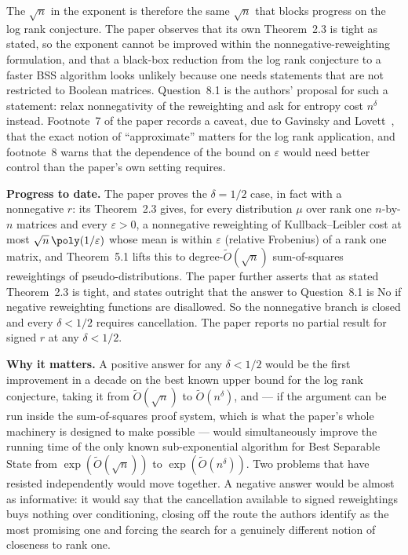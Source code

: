 \documentclass{conjura-conjecture}
\newcommand{\Ot}{\tilde{O}}
\begin{document}
The $\sqrt{n}$ in the exponent is therefore the same $\sqrt{n}$ that
blocks progress on the log rank conjecture. The paper observes that
its own Theorem~2.3 is tight as stated, so the exponent cannot be
improved within the nonnegative-reweighting formulation, and that a
black-box reduction from the log rank conjecture to a faster BSS
algorithm looks unlikely because one needs statements that are not
restricted to Boolean matrices. Question~8.1 is the authors' proposal
for such a statement: relax nonnegativity of the reweighting and ask
for entropy cost $n^{\delta}$ instead. Footnote~7 of the paper records
a caveat, due to Gavinsky and Lovett~\cite{GL14}, that the exact
notion of ``approximate'' matters for the log rank application, and
footnote~8 warns that the dependence of the bound on $\varepsilon$
would need better control than the paper's own setting requires.

\textbf{Progress to date.} The paper proves the $\delta = 1/2$ case,
in fact with a nonnegative $r$: its Theorem~2.3 gives, for every
distribution $\mu$ over rank one $n$-by-$n$ matrices and every
$\varepsilon > 0$, a nonnegative reweighting of Kullback--Leibler cost
at most $\sqrt{n}\,\poly(1/\varepsilon)$ whose mean is within
$\varepsilon$ (relative Frobenius) of a rank one matrix, and
Theorem~5.1 lifts this to degree-$\Ot(\sqrt{n})$ sum-of-squares
reweightings of pseudo-distributions. The paper further asserts that
as stated Theorem~2.3 is tight, and states outright that the answer to
Question~8.1 is No if negative reweighting functions are disallowed.
So the nonnegative branch is closed and every $\delta < 1/2$ requires
cancellation. The paper reports no partial result for signed $r$ at
any $\delta < 1/2$.

\textbf{Why it matters.} A positive answer for any $\delta < 1/2$
would be the first improvement in a decade on the best known upper
bound for the log rank conjecture, taking it from $\Ot(\sqrt{n})$ to
$\Ot(n^{\delta})$, and --- if the argument can be run inside the
sum-of-squares proof system, which is what the paper's whole machinery
is designed to make possible --- would simultaneously improve the
running time of the only known sub-exponential algorithm for Best
Separable State from $\exp(\Ot(\sqrt{n}))$ to $\exp(\Ot(n^{\delta}))$.
Two problems that have resisted independently would move together. A
negative answer would be almost as informative: it would say that the
cancellation available to signed reweightings buys nothing over
conditioning, closing off the route the authors identify as the most
promising one and forcing the search for a genuinely different notion
of closeness to rank one.
\end{document}
